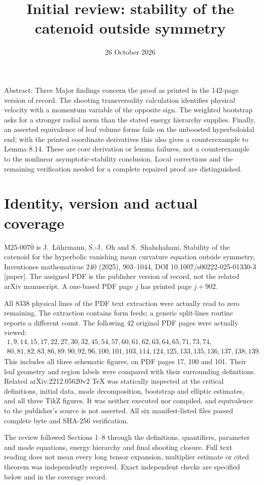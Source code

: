 \documentclass[10pt]{article}
\title{Initial review: stability of the catenoid
outside symmetry}
\author{}
\date{26 October 2026}
\begin{document}
\maketitle
Abstract: Three Major findings concern the proof as printed in the 142-page version of record. The shooting transversality calculation identifies physical velocity with a momentum variable of the opposite sign. The weighted bootstrap asks for a stronger radial norm than the stated energy hierarchy supplies. Finally, an asserted equivalence of leaf volume forms fails on the unboosted hyperboloidal end; with the printed coordinate derivatives this also gives a counterexample to Lemma 8.14. These are core derivation or lemma failures, not a counterexample to the nonlinear asymptotic-stability conclusion. Local corrections and the remaining verification needed for a complete repaired proof are distinguished.\par
\section*{Identity, version and actual coverage}
M25-0070 is J. Lührmann, S.-J. Oh and S. Shahshahani, Stability of the catenoid for the hyperbolic vanishing mean curvature equation outside symmetry, Inventiones mathematicae 240 (2025), 903–1044, DOI 10.1007/s00222-025-01330-3 [paper]. The assigned PDF is the publisher version of record, not the related arXiv manuscript. A one-based PDF page \(j\) has printed page \(j+902\).\par
All 8338 physical lines of the PDF text extraction were actually read to zero remaining. The extraction contains form feeds; a generic split-lines routine reports a different count. The following 42 original PDF pages were actually viewed: \[\begin{gathered}
1,9,14,15,17,22,27,30,32,45,54,57,60,61,62,63,64,65,71,73,74,\\
80,81,82,83,86,89,90,92,96,100,101,103,114,124,125,133,135,136,137,138,139.
\end{gathered}\] This includes all three schematic figures, on PDF pages 17, 100 and 101. Their leaf geometry and region labels were compared with their surrounding definitions. Related arXiv:2212.05620v2 TeX was statically inspected at the critical definitions, initial data, mode decomposition, bootstrap and elliptic estimates, and all three TikZ figures. It was neither executed nor compiled, and equivalence to the publisher’s source is not asserted. All six manifest-listed files passed complete byte and SHA-256 verification.\par
The review followed Sections 1–8 through the definitions, quantifiers, parameter and mode equations, energy hierarchy and final shooting closure. Full text reading does not mean every long tensor expansion, multiplier estimate or cited theorem was independently reproved. Exact independent checks are specified below and in the coverage record.\par
\end{document}
